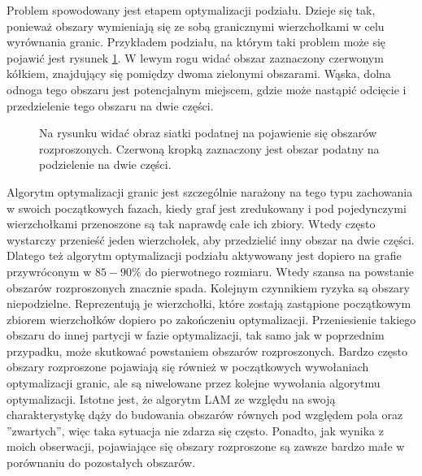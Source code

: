 Problem spowodowany jest etapem optymalizacji podziału.
Dzieje się tak, ponieważ obszary wymieniają się ze sobą granicznymi wierzchołkami w celu wyrównania granic.
Przykładem podziału, na którym taki problem może się pojawić jest rysunek \ref{im:noises_2}.
W lewym rogu widać obszar zaznaczony czerwonym kółkiem, znajdujący się pomiędzy dwoma zielonymi obszarami.
Wąska, dolna odnoga tego obszaru jest potencjalnym miejscem, gdzie może nastąpić
odcięcie i przedzielenie tego obszaru na dwie części.

\begin{figure}[h]
\centering
{}
\caption{Na rysunku widać obraz siatki podatnej na pojawienie się obszarów rozproszonych. Czerwoną kropką zaznaczony jest obszar podatny
na podzielenie na dwie części.}
\label{im:noises_2}
\end{figure}

Algorytm optymalizacji granic jest szczególnie narażony na tego typu zachowania w swoich początkowych fazach,
kiedy graf jest zredukowany i pod pojedynczymi wierzchołkami przenoszone są tak naprawdę całe ich zbiory.
Wtedy często wystarczy przenieść jeden wierzchołek, aby przedzielić inny obszar na dwie części.
Dlatego też algorytm optymalizacji podziału aktywowany jest dopiero na grafie przywróconym w $85-90\%$ do
pierwotnego rozmiaru.
Wtedy szansa na powstanie obszarów rozproszonych znacznie spada.
Kolejnym czynnikiem ryzyka są obszary niepodzielne.
Reprezentują je wierzchołki, które zostają zastąpione początkowym zbiorem wierzchołków
dopiero po zakończeniu optymalizacji.
Przeniesienie takiego obszaru do innej partycji w fazie optymalizacji, tak samo jak w poprzednim przypadku, może skutkować
powstaniem obszarów rozproszonych.
Bardzo często obszary rozproszone pojawiają się również w początkowych wywołaniach optymalizacji granic, ale są niwelowane przez
kolejne wywołania algorytmu optymalizacji.
Istotne jest, że algorytm LAM ze względu na swoją charakterystykę dąży do budowania obszarów równych pod względem
pola oraz ''zwartych'', więc taka sytuacja nie zdarza się często.
Ponadto, jak wynika z moich obserwacji, pojawiające się obszary rozproszone są zawsze bardzo małe w
porównaniu do pozostałych obszarów.

